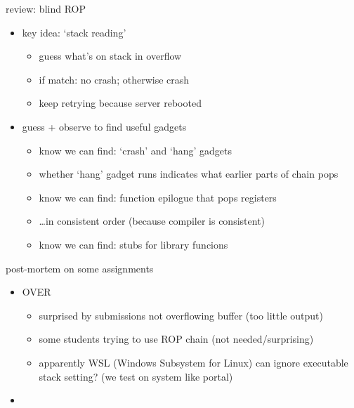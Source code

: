 \begin{frame}{review: blind ROP}
    \begin{itemize}
    \item key idea: `stack reading'
        \begin{itemize}
        \item guess what's on stack in overflow
        \item if match: no crash; otherwise crash
        \item keep retrying because server rebooted
        \end{itemize}
    \item guess + observe to find useful gadgets
        \begin{itemize}
        \item know we can find: `crash' and `hang' gadgets
        \item whether `hang' gadget runs indicates what earlier parts of chain pops
        \item know we can find: function epilogue that pops registers
        \item \ldots in consistent order (because compiler is consistent)
        \item know we can find: stubs for library funcions
        \end{itemize}
    \end{itemize}
\end{frame}

\begin{frame}{post-mortem on some assignments}
    \begin{itemize}
    \item OVER
        \begin{itemize}
        \item surprised by submissions not overflowing buffer (too little output)
        \item some students trying to use ROP chain (not needed/surprising)
        \item apparently WSL (Windows Subsystem for Linux) can ignore executable stack setting? (we test on system like portal)
        \end{itemize}
    \item 
    \end{itemize}
\end{frame}

